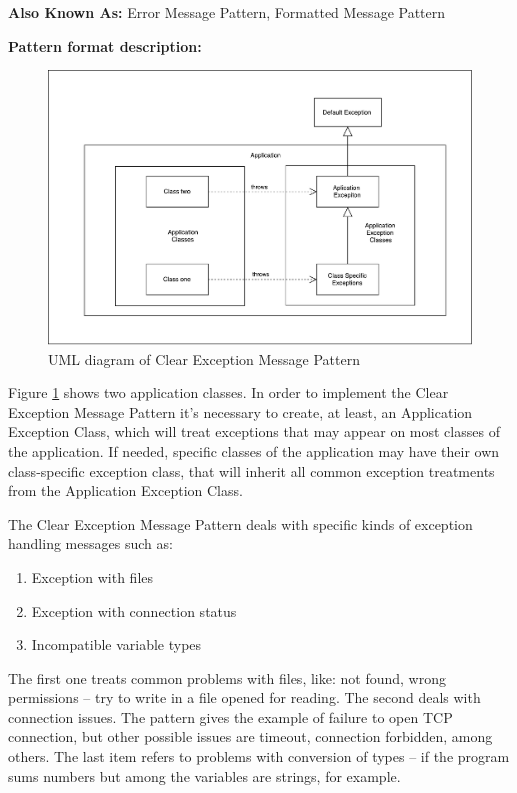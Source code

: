 \documentclass[12pt]{article}
\begin{document}
\begin{flushleft}
\textbf{Also Known As:} Error Message Pattern, Formatted Message Pattern\\
\end{flushleft}

\begin{flushleft}
\textbf{Pattern format description:}
\end{flushleft}

\begin{figure}[!htb]
\includegraphics[width=\textwidth]{diagrama.pdf}
\caption{UML diagram of Clear Exception Message Pattern}
\label{UML-diagram}
\end{figure}

Figure \ref{UML-diagram} shows two application classes. In order to implement the Clear Exception Message Pattern it's necessary to create, at least, an Application Exception Class, which will treat exceptions that may appear on most classes of the application. If needed, specific classes of the application may have their own class-specific exception class, that will inherit all common exception treatments from the Application Exception Class. 

\newpage
The Clear Exception Message Pattern deals with specific kinds of exception handling messages such as:
 \begin{enumerate}
 \item Exception with files
 \item Exception with connection status
 \item Incompatible variable types 
  \end{enumerate} 
 
The first one treats common problems with files, like: not found, wrong permissions -- try to write in a file opened for reading. The second deals with connection issues. The pattern gives the example of failure to open TCP connection, but other possible issues are timeout, connection forbidden, among others. The last item refers to problems with conversion of types -- if the program sums numbers but among the variables are strings, for example.
\end{document}
